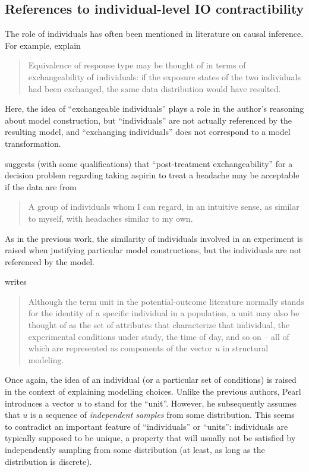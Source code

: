 \subsection{References to individual-level IO contractibility}

The role of individuals has often been mentioned in literature on causal inference. For example, \citet{greenland_identifiability_1986} explain
\begin{quote}
    Equivalence of response type may be thought of in terms of exchangeability of individuals: if the exposure states of the two individuals had been exchanged, the same data distribution would have resulted.
\end{quote}
Here, the idea of ``exchangeable individuals'' plays a role in the author's reasoning about model construction, but ``individuals'' are not actually referenced by the resulting model, and ``exchanging individuals'' does not correspond to a model transformation.

\citet{dawid_decision-theoretic_2020} suggests (with some qualifications) that ``post-treatment exchangeability'' for a decision problem regarding taking aspirin to treat a headache may be acceptable if the data are from
\begin{quote}
    A group of individuals whom I can regard, in an intuitive sense, as similar to myself, with headaches similar to my own.
\end{quote}
As in the previous work, the similarity of individuals involved in an experiment is raised when justifying particular model constructions, but the individuals are not referenced by the model.

\citet[pg. 98]{pearl_causality:_2009} writes
\begin{quote}
    Although the term unit in the potential-outcome literature normally stands for the identity of a specific individual in a population, a unit may also be thought of as the set of attributes that characterize that individual, the experimental conditions under study, the time of day, and so on – all of which are represented as components of the vector $u$ in structural modeling.
\end{quote}
Once again, the idea of an individual (or a particular set of conditions) is raised in the context of explaining modelling choices. Unlike the previous authors, Pearl introduces a vector $u$ to stand for the ``unit''. However, he subsequently assumes that $u$ is a sequence of \emph{independent samples} from some distribution. This seems to contradict an important feature of ``individuals'' or ``units'': individuals are typically supposed to be unique, a property that will usually not be satisfied by independently sampling from some distribution (at least, as long as the distribution is discrete).

